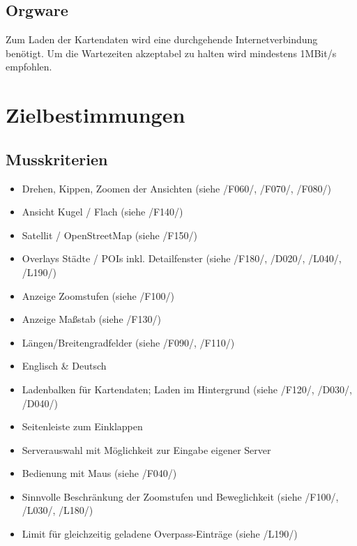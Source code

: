 \documentclass[10pt]{scrreprt}
\begin{document}
\section{Orgware}
Zum Laden der Kartendaten wird eine durchgehende Internetverbindung benötigt. Um die Wartezeiten akzeptabel zu halten wird mindestens 1MBit/s empfohlen.




\chapter{Zielbestimmungen}

\section{Musskriterien}
\begin{itemize}
\item Drehen, Kippen, Zoomen der Ansichten (siehe /F060/, /F070/, /F080/)
\item Ansicht Kugel / Flach (siehe /F140/)
\item Satellit / OpenStreetMap (siehe /F150/)
\item Overlays Städte / POIs inkl. Detailfenster (siehe /F180/, /D020/, /L040/, /L190/)
\item Anzeige Zoomstufen (siehe /F100/)
\item Anzeige Maßstab (siehe /F130/)
\item Längen/Breitengradfelder (siehe /F090/, /F110/)
\item Englisch \& Deutsch
\item Ladenbalken für Kartendaten; Laden im Hintergrund (siehe /F120/, /D030/, /D040/)
\item Seitenleiste zum Einklappen
\item Serverauswahl mit Möglichkeit zur Eingabe eigener Server
\item Bedienung mit Maus (siehe /F040/)
\item Sinnvolle Beschränkung der Zoomstufen und Beweglichkeit (siehe /F100/, /L030/, /L180/)
\item Limit für gleichzeitig geladene Overpass-Einträge (siehe /L190/)
\end{itemize}
\end{document}

